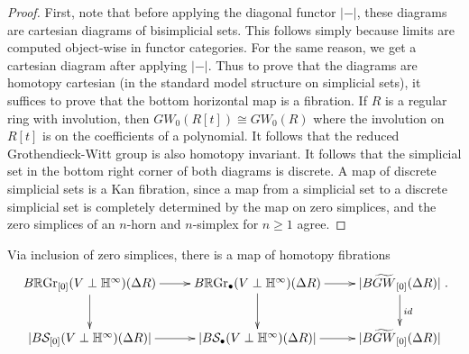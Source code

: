 \documentclass[draftthesis,tocnosub,noragright,centerchapter,10pt]{uiucthesis2009}
\newcommand{\Z}{\mathbb Z}
\newcommand{\mbb}{\mathbb}
\newcommand{\mc}{\mathcal}
\newcommand{\RGr}{\mathbb R\mathrm{Gr}}
\DeclareMathOperator*{\colim}{colim}
\theoremstyle{plain}
\theoremstyle{definition}
\begin{document}
\begin{proof}



First, note that before applying the diagonal functor $| - |$, these
diagrams are cartesian diagrams of bisimplicial sets. This follows
simply because limits are computed object-wise in functor
categories. For the same reason, we get a cartesian diagram after
applying $| - |$. Thus to prove that the diagrams are homotopy
cartesian (in the standard model structure on simplicial sets), it
suffices to prove that the bottom horizontal map is a fibration. If $R$
is a regular ring with involution, then $GW_0(R[t]) \cong GW_0(R)$
where the involution on $R[t]$ is on the coefficients of a
polynomial. It follows that the reduced Grothendieck-Witt group is
also homotopy invariant. It follows that the simplicial set in the bottom right
corner of both diagrams is discrete. A map of discrete simplicial sets
is a Kan fibration, since a map from a simplicial set to a discrete
simplicial set is completely determined by the map on zero simplices,
and the zero simplices of an $n$-horn and $n$-simplex for $n \geq 1$ agree.
\end{proof}



Via inclusion of zero simplices, there is a map of homotopy fibrations
\begin{equation}\label{dia:Grass_GW}
\begin{gathered}
\xymatrix{B\RGr_{[0]}(V \perp \mbb H^\infty)(\Delta R) \ar[r]\ar[d] & B\RGr_\bullet(V
  \perp \mbb H^\infty)(\Delta R) \ar[d] \ar[r] &
  |B\widetilde{GW}_{[0]}(\Delta R)| \ar[d]^{id} \\
|B\mc S_{[0]}(V \perp \mbb H^\infty)(\Delta R)| \ar[r]& |B\mc S_\bullet(V
  \perp \mbb H^\infty)(\Delta R)| \ar[r] &
  |B\widetilde{GW}_{[0]}(\Delta R)|}. 
\end{gathered}
\end{equation}
\end{document}
